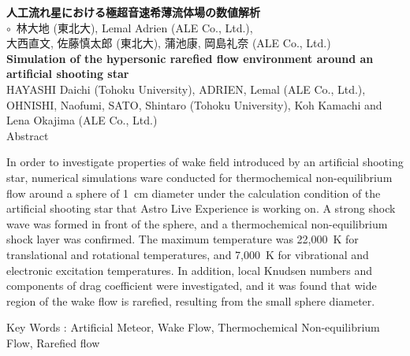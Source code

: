 \documentclass[a4paper,10pt]{jsarticle}
\begin{document}
%
\begin{center}
  {\fontsize{14pt}{0pt}\selectfont \textbf{人工流れ星における極超音速希薄流体場の数値解析}\\}
  \vspace{10pt}
  {\fontsize{9.5pt}{12pt}\selectfont $\circ$~林大地 (東北大), Lemal Adrien (ALE Co., Ltd.),\\ \vspace{3pt}
  大西直文, 佐藤慎太郎 (東北大), 蒲池康, 岡島礼奈 (ALE Co., Ltd.)\\}
  \vspace{10pt}
  {\fontsize{12pt}{0pt}\selectfont \textbf{Simulation of the hypersonic rarefied flow environment around an artificial shooting star}\\}
  \vspace{10pt}
  \fontsize{9.5pt}{0pt}\selectfont
  HAYASHI Daichi (Tohoku University), ADRIEN, Lemal (ALE Co., Ltd.),\\ \vspace{3pt}
  OHNISHI, Naofumi, SATO, Shintaro (Tohoku University), Koh Kamachi and Lena Okajima (ALE Co., Ltd.) \\
  \vspace{10.5pt}
  Abstract \\
  \vspace{-9pt}
\end{center}

\fontsize{9.5pt}{12pt}\selectfont
In order to investigate properties of wake field introduced by an artificial shooting star, numerical simulations ware conducted for thermochemical non-equilibrium flow around a sphere of 1~cm diameter under the calculation condition of the artificial shooting star that Astro Live Experience is working on. A strong shock wave was formed in front of the sphere, and a thermochemical non-equilibrium shock layer was confirmed. The maximum temperature was 22,000~K for translational and rotational temperatures, and 7,000~K for vibrational and electronic excitation temperatures. In addition, local Knudsen numbers and components of drag coefficient were investigated, and it was found that wide region of the wake flow is rarefied, resulting from the small sphere diameter.

\begin{center}
    Key Words : Artificial Meteor, Wake Flow, Thermochemical Non-equilibrium Flow, Rarefied flow\\
    \vspace{10.5pt}
\end{center}
\end{document}
